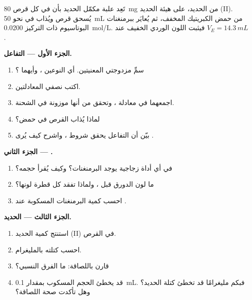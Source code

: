\begin{problem}
\label{pb:g11:titration:1}
تَعِد علبة مكمّل الحديد بأن في كل قرص \qty{80}{mg} من الحديد، على هيئة
الحديد (II). يُسحق قرص ويُذاب في نحو \qty{50}{mL} من
حمض الكبريتيك المخفف، ثم يُعايَر ببرمنغنات البوتاسيوم ذات التركيز
\qty{0.0200}{mol/L}. فيثبت اللون الوردي الخفيف عند $V_E = \qty{14.3}{mL}$.

\medskip
\noindent\textbf{الجزء الأول --- التفاعل.}
\begin{enumerate}
  \item سمِّ مزدوجتي   المعنيتين. أي النوعين
        ، وأيهما ؟
  \item اكتب نصفي المعادلتين.
  \item اجمعهما في معادلة ، وتحقق من أنها
        موزونة في الشحنة.
  \item لماذا يُذاب القرص في حمض؟
  \item بيّن أن التفاعل يحقق شروط ،
        واشرح كيف يُرى .
\end{enumerate}

\medskip
\noindent\textbf{الجزء الثاني --- .}
\begin{enumerate}[resume]
  \item في أي أداة زجاجية يوجد  البرمنغنات؟ وكيف
        يُقرأ حجمه؟
  \item ما لون الدورق قبل ، ولماذا تفقد كل
        قطرة لونها؟
  \item احسب كمية البرمنغنات المسكوبة عند .
\end{enumerate}

\medskip
\noindent\textbf{الجزء الثالث --- الحديد.}
\begin{enumerate}[resume]
  \item استنتج كمية الحديد (II) في القرص.
  \item احسب كتلته بالمليغرام.
  \item قارن باللصاقة: ما الفرق النسبي؟
  \item قد يخطئ الحجم المسكوب بمقدار \qty{0.1}{mL}. فبكم
        مليغرامًا قد تخطئ كتلة الحديد؟ وهل تأكدت صحة اللصاقة؟
\end{enumerate}


\end{problem}

